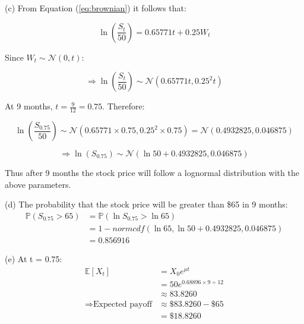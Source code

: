 \documentclass[openany, amssymb, psamsfonts]{amsart}
\theoremstyle{definition}
\numberwithin{equation}{section}
\begin{document}
(c) From Equation (\ref{eq:brownian}) it follows that:

\[  
  \ln\left(\frac{S_t}{50}\right) = 0.65771t + 0.25W_t
\]

Since $W_t \sim \mathcal{N}(0, t)$:

\[\Rightarrow \ln\left(\frac{S_t}{50}\right) \sim \mathcal{N}(0.65771t, 0.25^2t)\]

At 9 months, $t = \frac{9}{12} = 0.75$. Therefore:

\[\ln\left(\frac{S_{0.75}}{50}\right) \sim \mathcal{N}(0.65771 \times 0.75, 0.25^2\times 0.75) = \mathcal{N}(0.4932825, 0.046875) \]

\[
  \Rightarrow \ln(S_{0.75}) \sim \mathcal{N}(\ln50 + 0.4932825, 0.046875) 
\]

Thus after 9 months the stock price will follow a lognormal distribution with the above parameters.

(d) The probability that the stock price will be greater than \$65 in 9 months:
\[
  \begin{split}
    \mathbb{P}(S_{0.75} > 65) &= \mathbb{P}(\ln S_{0.75} > \ln 65)\\
    &= 1 - normcdf(\ln 65,\ln 50 + 0.4932825,0.046875) \\
    &= 0.856916
  \end{split}
\]

(e)
At t = 0.75:
\[
  \begin{split}
    \mathbb{E}[X_t] &= X_0e^{\mu t}\\
    &= 50e^{0.68896\times 9 \div 12}\\
    &\approx 83.8260 \\
    \Rightarrow \text{Expected payoff} &\approx \$83.8260 - \$65\\
    &= \$18.8260
  \end{split}  
\]
\end{document}
